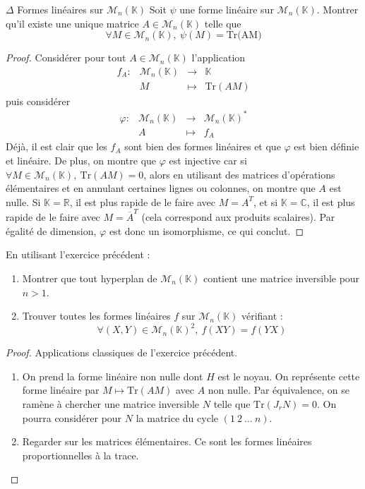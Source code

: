 \documentclass[french,a4paper]{article}
\newcommand{\R}{\mathbb{R}}
\newcommand{\C}{\mathbb{C}}
\newcommand{\K}{\mathbb{K}}
\newcommand{\st}{^*}
\newcommand{\Tr}{\text{Tr}}
\theoremstyle{plain}
\theoremstyle{definition}
\theoremstyle{remark}
\begin{document}
\begin{ex}{$\Delta$ Formes linéaires sur $\mathcal{M}_n(\K)$}
	Soit $\psi$ une forme linéaire sur $\mathcal{M}_n(\K)$. Montrer qu'il existe une unique matrice $A\in\mathcal{M}_n(\K)$ telle que $$\forall M\in\mathcal{M}_n(\K),\ \psi(M)=\text{Tr(AM)}$$
\end{ex}
\begin{proof}
	Considérer pour tout $A\in\mathcal{M}_n(\K)$ l'application $$\begin{array}{lrcl}
		f_A:&\mathcal{M}_n(\K)&\longrightarrow&\K \\
		&M&\longmapsto&\Tr(AM)
	\end{array}$$ puis considérer $$\begin{array}{lrcl}
		\varphi:&\mathcal{M}_n(\K)&\longrightarrow&\mathcal{M}_n(\K)\st\\
		&A&\longmapsto&f_A
	\end{array}$$ Déjà, il est clair que les $f_A$ sont bien des formes linéaires et que $\varphi$ est bien définie et linéaire. De plus, on montre que $\varphi$ est injective car si $\forall M\in\mathcal{M}_n(\K),\ \Tr(AM)=0$, alors en utilisant des matrices d'opérations élémentaires et en annulant certaines lignes ou colonnes, on montre que $A$ est nulle. Si $\K=\R$, il est plus rapide de le faire avec $M=A^T$, et si $\K=\C$, il est plus rapide de le faire avec $M=\overline{A}^T$ (cela correspond aux produits scalaires). Par égalité de dimension, $\varphi$ est donc un isomorphisme, ce qui conclut.
\end{proof}

\begin{ex}{}
	En utilisant l'exercice précédent :
	\begin{enumerate}
		\item Montrer que tout hyperplan de $\mathcal{M}_n(\K)$ contient une matrice inversible pour $n>1$.
		\item Trouver toutes les formes linéaires $f$ sur $\mathcal{M}_n(\K)$ vérifiant : $$\forall (X,Y)\in\mathcal{M}_n(\K)^2,\ f(XY)=f(YX)$$
	\end{enumerate}
\end{ex}
\begin{proof}
	Applications classiques de l'exercice précédent.
	\begin{enumerate}
		\item On prend la forme linéaire non nulle dont $H$ est le noyau. On représente cette forme linéaire par $M\mapsto\Tr(AM)$ avec $A$ non nulle. Par équivalence, on se ramène à chercher une matrice inversible $N$ telle que $\Tr(J_r N)=0$. On pourra considérer pour $N$ la matrice du cycle $(1\ 2\ \ldots \ n)$.
		\item Regarder sur les matrices élémentaires. Ce sont les formes linéaires proportionnelles à la trace.
	\end{enumerate}
\end{proof}
\end{document}
